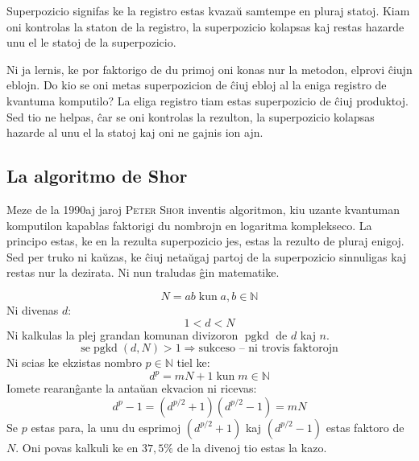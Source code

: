 \documentclass[utf8]{scrartcl}
\DeclareMathOperator{\pgkd}{pgkd}
\begin{document}
Superpozicio signifas ke la registro estas kvazaŭ samtempe en pluraj statoj.
Kiam oni kontrolas la staton de la registro, la superpozicio kolapsas kaj
restas hazarde unu el le statoj de la superpozicio.

Ni ja lernis, ke por faktorigo de du primoj oni konas nur la metodon, elprovi
ĉiujn eblojn.  Do kio se oni metas superpozicion de ĉiuj ebloj al la eniga
registro de kvantuma komputilo?  La eliga registro tiam estas superpozicio de
ĉiuj produktoj. Sed tio ne helpas, ĉar se oni kontrolas la rezulton, la
superpozicio kolapsas hazarde al unu el la statoj kaj oni ne gajnis ion ajn.


\subsection{La algoritmo de Shor}

Meze de la 1990aj jaroj \textsc{Peter Shor} inventis algoritmon, kiu uzante
kvantuman komputilon kapablas faktorigi du nombrojn en logaritma
komplekseco. La principo estas, ke en la rezulta superpozicio jes, estas la
rezulto de pluraj enigoj. Sed per truko ni kaŭzas, ke ĉiuj netaŭgaj partoj de
la superpozicio sinnuligas kaj restas nur la dezirata. Ni nun traludas ĝin
matematike.


\begin{equation}
  \label{eq:produkto}
  N = a b \;\text{kun}\; a, b \in \mathbb{N}
\end{equation}
%
Ni divenas $d$:
\begin{equation}
  \label{eq:diveno}
  1 < d < N
\end{equation}
%
Ni kalkulas la plej grandan komunan divizoron $\pgkd$ de $d$ kaj $n$.
\begin{equation}
  \label{eq:diveno-sukceso}
  \text{se} \pgkd(d, N) > 1 \Longrightarrow\text{sukceso – ni trovis faktorojn}
\end{equation}
%
Ni scias ke ekzistas nombro $p \in \mathbb{N}$ tiel ke:
\begin{equation}
  \label{eq:ekzistas-p}
  d^p = m N + 1 \;\text{kun}\; m \in \mathbb{N}
\end{equation}
%
Iomete rearanĝante la antaŭan ekvacion ni ricevas:
\begin{equation}
  \label{eq:dp-divizoroj}
  d^p - 1 = \left(d^{p/2} + 1\right)\left(d^{p/2} - 1\right) = m N
\end{equation}
%
Se $p$ estas para, la unu du esprimoj $\left(d^{p/2} + 1\right)$ kaj
$\left(d^{p/2} - 1\right)$ estas faktoro de $N$. Oni povas kalkuli ke en
$37,5 \%$ de la divenoj tio estas la kazo.
\end{document}
